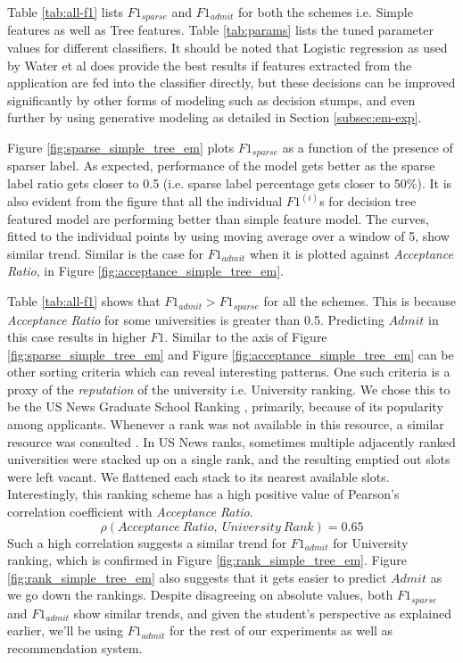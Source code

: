 \documentclass{sig-alternate-05-2015}
\begin{document}
Table \ref{tab:all-f1} lists $F1_{sparse}$ and $F1_{admit}$ for both the schemes i.e. Simple features as well as Tree features. Table \ref{tab:params} lists the tuned parameter values for different classifiers. It should be noted that Logistic regression as used by Water et al \cite{waters:iaai13} does provide the best results if features extracted from the application are fed into the classifier directly, but these decisions can be improved significantly by other forms of modeling such as decision stumps, and even further by using generative modeling as detailed in Section \ref{subsec:em-exp}.

Figure \ref{fig:sparse_simple_tree_em} plots $F1_{sparse}$ as a function of the presence of sparser label. As expected, performance of the model gets better as the sparse label ratio gets closer to 0.5 (i.e. sparse label percentage gets closer to 50\%). It is also evident from the figure that all the individual $F1^{(i)}$s for decision tree featured model are performing better than simple feature model. The curves, fitted to the individual points by using moving average over a window of 5, show similar trend. Similar is the case for $F1_{admit}$ when it is plotted against \textit{Acceptance Ratio}, in Figure \ref{fig:acceptance_simple_tree_em}.

Table \ref{tab:all-f1} shows that $F1_{admit} > F1_{sparse}$ for all the schemes. This is because \textit{Acceptance Ratio} for some universities is greater than 0.5. Predicting $Admit$ in this case results in higher $F1$. Similar to the axis of Figure \ref{fig:sparse_simple_tree_em} and Figure \ref{fig:acceptance_simple_tree_em} can be other sorting criteria which can reveal interesting patterns. One such criteria is a proxy of the \textit{reputation} of the university i.e. University ranking. We chose this to be the US News Graduate School Ranking \cite{usnews}, primarily, because of its popularity among applicants. Whenever a rank was not available in this resource, a similar resource was consulted \cite{qs, shanghai}. In US News ranks, sometimes multiple adjacently ranked universities were stacked up on a single rank, and the resulting emptied out slots were left vacant. We flattened each stack to its nearest available slots. Interestingly, this ranking scheme has a high positive value of Pearson's correlation coefficient with \textit{Acceptance Ratio}.
$$\rho(Acceptance~Ratio,~University~Rank) = 0.65$$
Such a high correlation suggests a similar trend for $F1_{admit}$ for University ranking, which is confirmed in Figure \ref{fig:rank_simple_tree_em}. Figure \ref{fig:rank_simple_tree_em} also suggests that it gets easier to predict $Admit$ as we go down the rankings. Despite disagreeing on absolute values, both $F1_{sparse}$ and $F1_{admit}$ show similar trends, and given the student's perspective as explained earlier, we'll be using $F1_{admit}$ for the rest of our experiments as well as recommendation system.
\end{document}
